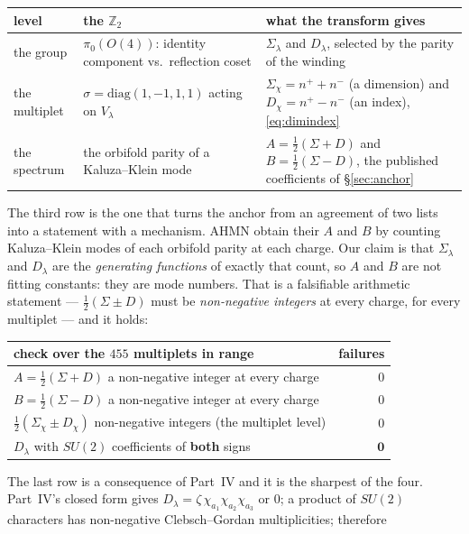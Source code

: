 \documentclass[11pt,a4paper]{article}
\newcommand{\ZZ}{\mathbb{Z}}
\newcommand{\Sig}{\Sigma_\lambda}
\newcommand{\Dl}{D_\lambda}
\begin{document}
\begin{center}\small
{}
\begin{tabular}{p{3.2cm} p{5.3cm} p{6.3cm}}
\toprule
\rowcolor{hdrblue!14}\textbf{level} & \textbf{the $\ZZ_2$} & \textbf{what the transform gives}\\
\midrule
the group & $\pi_0(O(4))$: identity component vs.\ reflection coset & $\Sig$ and $\Dl$, selected by
the parity of the winding\\
the multiplet & $\sigma=\mathrm{diag}(1,-1,1,1)$ acting on $V_\lambda$ & $\Sigma_\chi=n^++n^-$ (a
dimension) and $D_\chi=n^+-n^-$ (an index), \eqref{eq:dimindex}\\
the spectrum & the orbifold parity of a Kaluza--Klein mode & $A=\tfrac12(\Sigma+D)$ and
$B=\tfrac12(\Sigma-D)$, the published coefficients of \S\ref{sec:anchor}\\
\bottomrule
\end{tabular}
\end{center}

\noindent The third row is the one that turns the anchor from an agreement of two lists into a
statement with a mechanism. AHMN obtain their $A$ and $B$ by counting Kaluza--Klein modes of each
orbifold parity at each charge. Our claim is that $\Sig$ and $\Dl$ are the \emph{generating
functions} of exactly that count, so $A$ and $B$ are not fitting constants: they are mode numbers.
That is a falsifiable arithmetic statement --- $\tfrac12(\Sigma\pm D)$ must be \emph{non-negative
integers} at every charge, for every multiplet --- and it holds:

\begin{center}\small
{}
\begin{tabular}{lr}
\toprule
\rowcolor{hdrblue!14}\textbf{check over the $455$ multiplets in range} & \textbf{failures}\\
\midrule
$A=\tfrac12(\Sigma+D)$ a non-negative integer at every charge & $0$\\
$B=\tfrac12(\Sigma-D)$ a non-negative integer at every charge & $0$\\
$\tfrac12(\Sigma_\chi\pm D_\chi)$ non-negative integers (the multiplet level) & $0$\\
\rowcolor{okgreen!14}$\Dl$ with $SU(2)$ coefficients of \textbf{both} signs & $\mathbf{0}$\\
\bottomrule
\end{tabular}
\end{center}

The last row is a consequence of Part~IV and it is the sharpest of the four. Part~IV's closed form
gives $\Dl=\zeta\,\chi_{a_1}\chi_{a_2}\chi_{a_3}$ or $0$; a product of $SU(2)$ characters has non-negative
Clebsch--Gordan multiplicities; therefore
\end{document}
